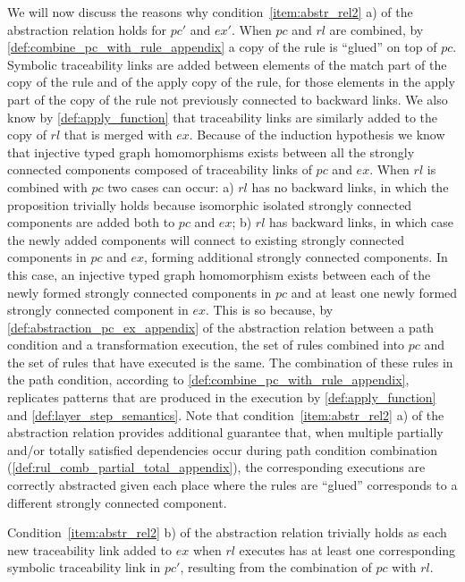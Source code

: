 \begin{ps}
\begin{itemize}
We will now discuss the reasons why condition~\ref{item:abstr_rel2} a) of the abstraction relation holds for $pc'$ and $ex'$. When $pc$ and $rl$ are combined, by \cref{def:combine_pc_with_rule_appendix} a copy of the rule is ``glued'' on top of $pc$. Symbolic traceability links are added between elements of the match part of the copy of the rule and of the apply copy of the rule, for those elements in the apply part of the copy of the rule not previously connected to backward links. We also know by \cref{def:apply_function} that traceability links are similarly added to the copy of $rl$ that is merged with $ex$. Because of the induction hypothesis we know that injective typed graph homomorphisms exists between all the strongly connected components composed of traceability links of $pc$ and $ex$. When $rl$ is combined with $pc$ two cases can occur: a) $rl$ has no backward links, in which the proposition trivially holds because isomorphic isolated strongly connected components are added both to $pc$ and $ex$; b) $rl$ has backward links, in which case the newly added components will connect to existing strongly connected components in $pc$ and $ex$, forming additional strongly connected components. In this case, an injective typed graph homomorphism exists between each of the newly formed strongly connected components in $pc$ and at least one newly formed strongly connected component in $ex$. This is so because, by \cref{def:abstraction_pc_ex_appendix} of the abstraction relation between a path condition and a transformation execution, the set of rules combined into $pc$ and the set of rules that have executed is the same. The combination of these rules in the path condition, according to \cref{def:combine_pc_with_rule_appendix}, replicates patterns that are produced in the execution by \cref{def:apply_function} and \cref{def:layer_step_semantics}. Note that condition~\ref{item:abstr_rel2} a) of the abstraction relation provides additional guarantee that, when multiple partially and/or totally satisfied dependencies occur during path condition combination (\cref{def:rul_comb_partial_total_appendix}), the corresponding executions are correctly abstracted given each place where the rules are ``glued'' corresponds to a different strongly connected component.\vspace{.3cm}
 
Condition~\ref{item:abstr_rel2} b) of the abstraction relation trivially holds as each new traceability link added to $ex$ when $rl$ executes has at least one corresponding symbolic traceability link in $pc'$, resulting from the combination of $pc$ with $rl$.  

\end{itemize}
\end{ps} 


